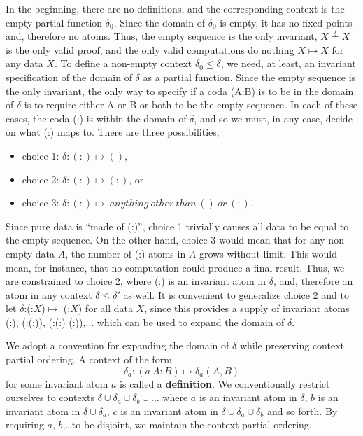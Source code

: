 \documentclass[11pt]{article}
\begin{document}
     In the beginning, there are no definitions, and the corresponding context is the empty partial function $\delta_0$.  
Since the domain of $\delta_0$ is empty, it has no fixed points and, therefore no atoms.  Thus, the empty sequence is the only invariant, 
$X{\overset \delta =}X$ is the only valid proof, and the only valid 
 computations do nothing $X\mapsto X$ for any data $X$.
To define a non-empty context $\delta_0\le\delta$, we need, at least, an invariant specification of the domain of $\delta$ as a partial function.    
Since the empty sequence is the only invariant, the only way to specify if a coda (A:B) is to be in the domain of $\delta$ is 
to require either A or B or both to be the empty sequence. In each of these cases, the coda (:) is within the domain of $\delta$, and so we must, in any case, 
decide on what (:) maps to.  There are three possibilities; 
\begin{itemize}
\item[] choice 1: {$\delta: (:) \mapsto ()$},
\item[] choice 2: {$\delta: (:) \mapsto (:)$}, or 
\item[] choice 3: {$\delta: (:) \mapsto \ anything\ other\ than\ ()\ or\ (:)$}. 
\end{itemize}
Since pure data is ``made of (:)'', choice 1 trivially causes all data to be equal to the empty sequence. 
On the other hand, choice 3 would mean that for any non-empty data $A$, the number of (:) atoms in $A$ grows without limit.  This would mean, for instance, 
that no computation could produce a final result.  Thus, we are constrained to choice 2, where (:) is an invariant atom in $\delta$, and, therefore an atom in 
any context $\delta\leq\delta'$ as well.  It is convenient to generalize choice 2 and to let $\delta$:(:$X$)$\mapsto$ (:$X$) for all data $X$, since this provides a 
supply of invariant atoms (:), (:(:)), (:(:) (:)),$\dots$ which can be used to expand the domain of $\delta$.  

We adopt a convention for expanding the domain of $\delta$ while preserving context partial ordering. 
A context of the form 
\begin{equation}
	\delta_a: (a\ A:B) \mapsto \delta_a(A,B)
\end{equation}
for some invariant atom $a$ is called a {\bf definition}.  We conventionally restrict ourselves to 
contexts $\delta\cup\delta_a\cup\delta_b\cup\dots$ where $a$ is an invariant atom in $\delta$, $b$ is an invariant atom in $\delta\cup\delta_a$, $c$ is an invariant atom in $\delta\cup\delta_a\cup\delta_b$ and so forth.  By requiring $a$, $b$,\dots to be disjoint, we maintain the context partial ordering.  
\end{document}
